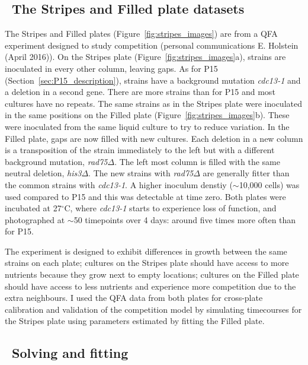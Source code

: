 \subsection{\thesubsection~The Stripes and Filled plate datasets}
\label{sec:stripes_description}

The Stripes and Filled plates (Figure~\ref{fig:stripes_images}) are
from a QFA experiment designed to study competition (personal
communications E. Holstein (April 2016)). On the Stripes plate
(Figure~\ref{fig:stripes_images}a), strains are inoculated in every
other column, leaving gaps. As for P15
(Section~\ref{sec:P15_description}), strains have a background
mutation \textit{cdc13-1} and a deletion in a second gene. There are
more strains than for P15 and most cultures have no repeats. The same
strains as in the Stripes plate were inoculated in the same positions
on the Filled plate (Figure~\ref{fig:stripes_images}b). These were
inoculated from the same liquid culture to try to reduce variation. In
the Filled plate, gaps are now filled with new cultures. Each deletion
in a new column is a transposition of the strain immediately to the
left but with a different background mutation,
\textit{rad75}\(\Delta\). The left most column is filled with the same
neutral deletion, \textit{his3}\(\Delta\). The new strains with
\textit{rad75}\(\Delta\) are generally fitter than the common strains
with \textit{cdc13-1}. A higher inoculum denstiy (\(\sim\)10,000
cells) was used compared to P15 and this was detectable at time
zero. Both plates were incubated at 27\(^{\circ}\)C, where
\textit{cdc13-1} starts to experience loss of function, and
photographed at \(\sim\)50 timepoints over 4 days: around five times
more often than for P15.

The experiment is designed to exhibit differences in growth between
the same strains on each plate; cultures on the Stripes plate should
have access to more nutrients because they grow next to empty
locations; cultures on the Filled plate should have access to less
nutrients and experience more competition due to the extra
neighbours. I used the QFA data from both plates for cross-plate
calibration and validation of the competition model by simulating
timecourses for the Stripes plate using parameters estimated by
fitting the Filled plate.

\subsection{\thesubsection~Solving and fitting}

